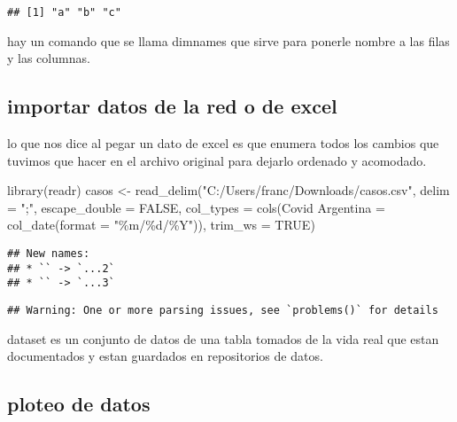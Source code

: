 \documentclass[]{elsarticle} %
\newenvironment{Shaded}{\begin{snugshade}}{\end{snugshade}}
\newcommand{\AttributeTok}[1]{\textcolor[rgb]{0.77,0.63,0.00}{#1}}
\newcommand{\ConstantTok}[1]{\textcolor[rgb]{0.00,0.00,0.00}{#1}}
\newcommand{\FunctionTok}[1]{\textcolor[rgb]{0.00,0.00,0.00}{#1}}
\newcommand{\NormalTok}[1]{#1}
\newcommand{\OtherTok}[1]{\textcolor[rgb]{0.56,0.35,0.01}{#1}}
\newcommand{\StringTok}[1]{\textcolor[rgb]{0.31,0.60,0.02}{#1}}
\begin{document}
\begin{verbatim}
## [1] "a" "b" "c"
\end{verbatim}

hay un comando que se llama dimnames que sirve para ponerle nombre a las
filas y las columnas.

\hypertarget{importar-datos-de-la-red-o-de-excel}{%
\subsection{importar datos de la red o de
excel}\label{importar-datos-de-la-red-o-de-excel}}

lo que nos dice al pegar un dato de excel es que enumera todos los
cambios que tuvimos que hacer en el archivo original para dejarlo
ordenado y acomodado.

\begin{Shaded}
\begin{Highlighting}[]
\FunctionTok{library}\NormalTok{(readr)}
\NormalTok{casos }\OtherTok{\textless{}{-}} \FunctionTok{read\_delim}\NormalTok{(}\StringTok{"C:/Users/franc/Downloads/casos.csv"}\NormalTok{, }
    \AttributeTok{delim =} \StringTok{";"}\NormalTok{, }\AttributeTok{escape\_double =} \ConstantTok{FALSE}\NormalTok{, }\AttributeTok{col\_types =} \FunctionTok{cols}\NormalTok{(}\StringTok{\textasciigrave{}}\AttributeTok{Covid Argentina}\StringTok{\textasciigrave{}} \OtherTok{=} \FunctionTok{col\_date}\NormalTok{(}\AttributeTok{format =} \StringTok{"\%m/\%d/\%Y"}\NormalTok{)), }
    \AttributeTok{trim\_ws =} \ConstantTok{TRUE}\NormalTok{)}
\end{Highlighting}
\end{Shaded}

\begin{verbatim}
## New names:
## * `` -> `...2`
## * `` -> `...3`
\end{verbatim}

\begin{verbatim}
## Warning: One or more parsing issues, see `problems()` for details
\end{verbatim}

dataset es un conjunto de datos de una tabla tomados de la vida real que
estan documentados y estan guardados en repositorios de datos.

\hypertarget{ploteo-de-datos}{%
\subsection{ploteo de datos}\label{ploteo-de-datos}}
\end{document}
